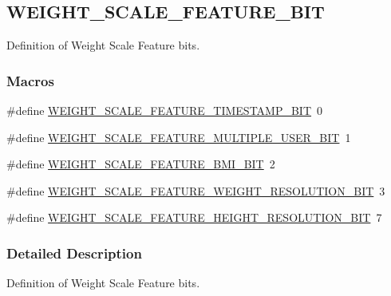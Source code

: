 \hypertarget{group___w_e_i_g_h_t___s_c_a_l_e___f_e_a_t_u_r_e___b_i_t}{}\subsection{W\+E\+I\+G\+H\+T\+\_\+\+S\+C\+A\+L\+E\+\_\+\+F\+E\+A\+T\+U\+R\+E\+\_\+\+B\+IT}
\label{group___w_e_i_g_h_t___s_c_a_l_e___f_e_a_t_u_r_e___b_i_t}


Definition of Weight Scale Feature bits.  


\subsubsection*{Macros}
\begin{DoxyCompactItemize}
\item 
\#define \hyperlink{group___w_e_i_g_h_t___s_c_a_l_e___f_e_a_t_u_r_e___b_i_t_ga0054d61782dec235cb7c150d503eef84}{W\+E\+I\+G\+H\+T\+\_\+\+S\+C\+A\+L\+E\+\_\+\+F\+E\+A\+T\+U\+R\+E\+\_\+\+T\+I\+M\+E\+S\+T\+A\+M\+P\+\_\+\+B\+IT}~0
\item 
\#define \hyperlink{group___w_e_i_g_h_t___s_c_a_l_e___f_e_a_t_u_r_e___b_i_t_gab9ba1ef876639fb9c3f871b68e89b1db}{W\+E\+I\+G\+H\+T\+\_\+\+S\+C\+A\+L\+E\+\_\+\+F\+E\+A\+T\+U\+R\+E\+\_\+\+M\+U\+L\+T\+I\+P\+L\+E\+\_\+\+U\+S\+E\+R\+\_\+\+B\+IT}~1
\item 
\#define \hyperlink{group___w_e_i_g_h_t___s_c_a_l_e___f_e_a_t_u_r_e___b_i_t_gab4d2d2a4922176dc6d999410004da02b}{W\+E\+I\+G\+H\+T\+\_\+\+S\+C\+A\+L\+E\+\_\+\+F\+E\+A\+T\+U\+R\+E\+\_\+\+B\+M\+I\+\_\+\+B\+IT}~2
\item 
\#define \hyperlink{group___w_e_i_g_h_t___s_c_a_l_e___f_e_a_t_u_r_e___b_i_t_gad6af1b40b025c85942837b7e3f65550a}{W\+E\+I\+G\+H\+T\+\_\+\+S\+C\+A\+L\+E\+\_\+\+F\+E\+A\+T\+U\+R\+E\+\_\+\+W\+E\+I\+G\+H\+T\+\_\+\+R\+E\+S\+O\+L\+U\+T\+I\+O\+N\+\_\+\+B\+IT}~3
\item 
\#define \hyperlink{group___w_e_i_g_h_t___s_c_a_l_e___f_e_a_t_u_r_e___b_i_t_ga6f61b21d30baf3fc256a5599f5df0dfc}{W\+E\+I\+G\+H\+T\+\_\+\+S\+C\+A\+L\+E\+\_\+\+F\+E\+A\+T\+U\+R\+E\+\_\+\+H\+E\+I\+G\+H\+T\+\_\+\+R\+E\+S\+O\+L\+U\+T\+I\+O\+N\+\_\+\+B\+IT}~7
\end{DoxyCompactItemize}


\subsubsection{Detailed Description}
Definition of Weight Scale Feature bits. 



